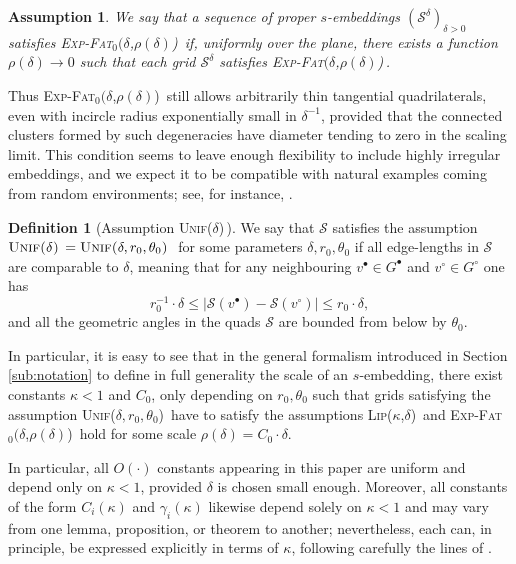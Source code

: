 \documentclass[reqno]{amsart}
\numberwithin{equation}{section}
\newtheorem{assumpintro}{Assumption}[section]
\theoremstyle{definition}
\newtheorem{definition}[theo]{Definition}
\theoremstyle{remark}
\newcommand\cS{\mathcal{S}}
\def\LipKd{{\mbox{\textsc{Lip(}$\kappa$\textsc{,}$\delta$\textsc{)}}}}
\def\ExpFat{{{\mbox{\textsc{Exp-Fat}$_0(\delta$\textsc{,}$\rho(\delta)$\textsc{)}}}}}
\def\ExpFatr{{{\mbox{\textsc{Exp-Fat}$(\delta$\textsc{,}$\rho(\delta)$\textsc{)}}}}}
\newcommand\Unif{{\mbox{\textsc{Unif(}$\delta$\textsc{)}}}}
\newcommand\Uniff{{\mbox{\textsc{Unif(}$\delta,r_0,\theta_0$\textsc{)}}}}
\begin{document}
\begin{assumpintro}\label{assump:ExpFat'}
We say that a sequence of proper $s$-embeddings $(\cS^\delta)_{\delta>0}$ satisfies \ExpFat\ if, uniformly over the plane, there exists a function $\rho(\delta)\to0$ such that each grid $\cS^\delta$ satisfies \ExpFatr\,. \end{assumpintro}

Thus \ExpFat\ still allows arbitrarily thin tangential quadrilaterals, even with incircle radius exponentially small in $\delta^{-1}$, provided that the connected clusters formed by such degeneracies have diameter tending to zero in the scaling limit. This condition seems to leave enough flexibility to include highly irregular embeddings, and we expect it to be compatible with natural examples coming from random environments; see, for instance, \cite{bou2024random,GJNN,Mah25}.



\begin{definition}[Assumption \Unif\,]
	We say that $\cS$ satisfies the assumption $\Unif\,=\Uniff\ $ for some parameters $\delta,r_0,\theta_0$ if all edge-lengths in $\cS$ are comparable to $\delta$, meaning that for any  neighbouring $v^{\bullet}\in G^\bullet$ and $v^{\circ}\in G^\circ$ one has
	\begin{equation}
		r_0^{-1}\cdot \delta \leq  |\cS(v^{\bullet})- \cS(v^{\circ})| \leq r_0\cdot \delta,
	\end{equation}
and all the geometric angles in the quads $\cS$ are bounded from below by $\theta_0$.
\end{definition}
In particular, it is easy to see that in the general formalism introduced in Section \ref{sub:notation} to define in full generality the scale of an $s$-embedding, there exist constants $\kappa<1$ and $C_0$, only depending on $r_0,\theta_0$ such that grids satisfying the assumption \Uniff\, have to satisfy the assumptions \LipKd\ and \ExpFat\ hold for some scale $\rho(\delta)=C_0\cdot \delta $. 

In particular, all $O(\cdot)$ constants appearing in this paper are uniform and depend only on $\kappa<1$, provided $\delta $ is chosen small enough. Moreover, all constants of the form $C_{i}(\kappa)$ and $\gamma_{i}(\kappa)$ likewise depend solely on $\kappa<1$ and may vary from one lemma, proposition, or theorem to another; nevertheless, each can, in principle, be expressed explicitly in terms of $\kappa$, following carefully the lines of \cite{CLR1,Che20}.
\end{document}
